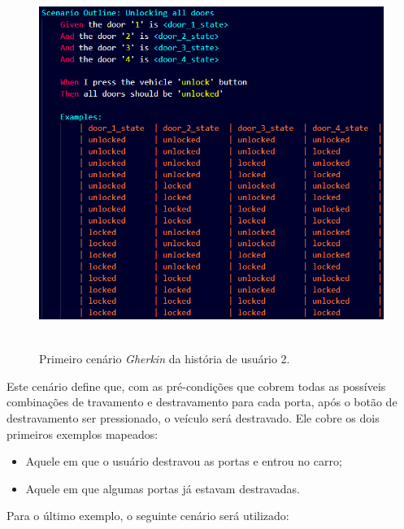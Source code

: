 \begin{figure}[H]
\centering
\includegraphics[height=12cm]{figuras/cenarios/h2c1.png}
\caption{Primeiro cenário \textit{Gherkin} da história de usuário 2.}
\label{fig:h2c1}
\end{figure}

Este cenário define que, com as pré-condições que cobrem todas as possíveis combinações de travamento e destravamento para cada porta, após o botão de destravamento 
ser pressionado, o veículo será destravado. Ele cobre os dois primeiros exemplos mapeados:
\begin{itemize}
    \item Aquele em que o usuário destravou as portas e entrou no carro;
    \item Aquele em que algumas portas já estavam destravadas.
\end{itemize}

Para o último exemplo, o seguinte cenário será utilizado:



